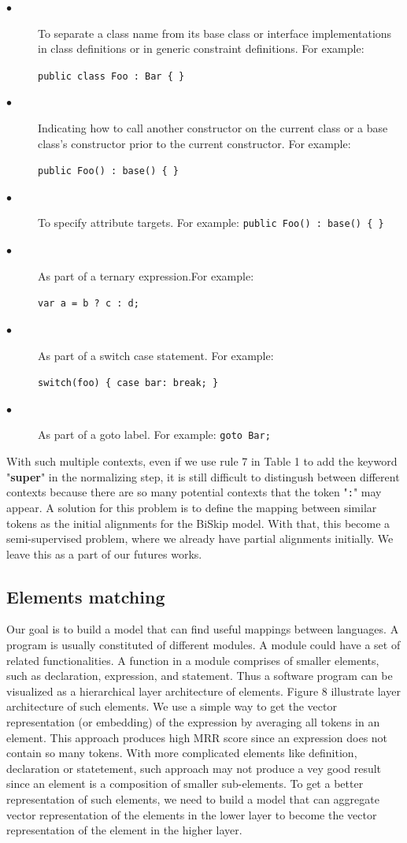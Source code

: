 \begin{description}
	\item [$\bullet$] To separate a class name from its base class or interface implementations in class definitions or in generic constraint definitions. For example: 
	
	\texttt{public class Foo : Bar \{ \}}
	\item [$\bullet$] Indicating how to call another constructor on the current class or a base class's constructor prior to the current constructor. For example: 
	
	\texttt{public Foo() : base() \{ \}}
	\item [$\bullet$] To specify attribute targets. For example: \texttt{public Foo() : base() \{ \}}
	\item [$\bullet$] As part of a ternary expression.For example:
	
 	\texttt{var a = b ? c : d;}
	\item [$\bullet$] As part of a switch case statement. For example:
	
	 \texttt{switch(foo) \{ case bar: break; \}}
	\item [$\bullet$] As part of a goto label. For example:
	\texttt{goto Bar;}

\end{description}

With such multiple contexts, even if we use rule 7 in Table 1 to add the keyword "\textbf{super}" in the normalizing step, it is still difficult to distingush between different contexts because there are so many potential contexts that the token "\texttt{:}" may appear. A solution for this problem is to define the mapping between similar tokens as the initial alignments for the BiSkip model. With that, this become a semi-supervised problem, where we already have partial alignments initially. We leave this as a part of our futures works.

\subsection{Elements matching}

Our goal is to build a model that can find useful mappings between languages. A program is usually constituted of different modules. A module could have a set of related functionalities. A function in a module comprises of smaller elements, such as declaration, expression, and statement. Thus a software program can be visualized as a hierarchical layer architecture of elements. Figure 8 illustrate layer architecture of such elements. We use a simple way to get the vector representation (or embedding) of the expression by averaging all tokens in an element. This approach produces high MRR score since an expression does not contain so many tokens. With more complicated elements like definition, declaration or statetement, such approach may not produce a vey good result since an element is a composition of smaller sub-elements. To get a better representation of such elements, we need to build a model that can aggregate vector representation of the elements in the lower layer to become the vector representation of the element in the higher layer. 

